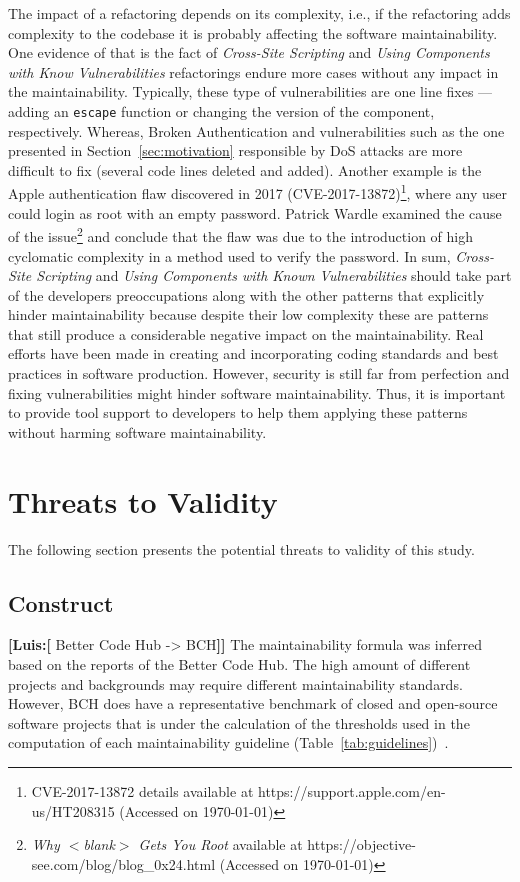 \documentclass[10pt,conference]{IEEEtran}
\newcommand{\Luis}[1]{\textbf{[Luis:[}{\color{green} #1}\textbf{]]}}
\begin{document}
{The impact of a refactoring depends on its complexity, i.e., if the refactoring
adds complexity to the codebase it is probably affecting the software
maintainability. One evidence of that is the fact of \emph{Cross-Site
Scripting} and \emph{Using Components with Know Vulnerabilities} refactorings
endure more cases without any impact in the maintainability. Typically, these
type of vulnerabilities are one line fixes --- adding an \texttt{escape}
function or changing the version of the component, respectively. Whereas,
Broken Authentication and vulnerabilities such as the one presented in
Section~\ref{sec:motivation} responsible by DoS attacks are more difficult to
fix (several code lines deleted and added). Another example is the Apple
authentication flaw discovered in 2017 (CVE-2017-13872)\footnote{CVE-2017-13872
details available at https://support.apple.com/en-us/HT208315 (Accessed on
\today{})}, where any user could login as root with an empty password. Patrick
Wardle examined the cause of the issue\footnote{\emph{Why $<$blank$>$ Gets You
Root} available at https://objective-see.com/blog/blog\_0x24.html (Accessed on
\today{})} and conclude that the flaw was due to the introduction of high
cyclomatic complexity in a method used to verify the password. In sum,
\emph{Cross-Site Scripting} and \emph{Using Components with Known
Vulnerabilities} should take part of the developers preoccupations along with
the other patterns that explicitly hinder maintainability because despite their
low complexity these are patterns that still produce a considerable negative
impact on the maintainability. Real efforts have been made in creating and
incorporating coding standards and best practices in software production.
However, security is still far from perfection and fixing vulnerabilities might
hinder software maintainability. Thus, it is important to provide tool support
to developers to help them applying these patterns without harming software
maintainability.

\section{Threats to Validity}\label{sec:threats}
%
The following section presents the potential threats to validity of this study.
%
\subsection{Construct}
%

\Luis{Better Code Hub -> BCH}
The maintainability formula was inferred based on the reports of the Better Code Hub.
The high amount of different projects and backgrounds may require different maintainability
standards. However, BCH does have a representative benchmark of closed and open-source
software projects that is under the calculation of the thresholds used in the computation
of each maintainability guideline (Table~\ref{tab:guidelines})~\cite{Visser:2016:OREILLY,
Baggen2012}.

}
\end{document}
